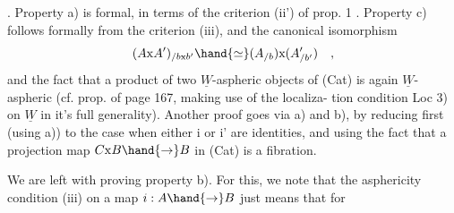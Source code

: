 \hand{\uline{\textcolor{black}{Proof}}}.  Property a) is formal,  in terms of the criterion (ii') of
prop. 1 .  Property c) follows formally from the criterion (iii),  and
the canonical isomorphism
\[ (A\mathrm{x}A')_{/b\mathrm{x}b'} \hand{\simeq} (A_{/b})\mathrm{x}(A'_{/b'}) \quad , \]
and the fact that a product of two $\underline{W}$-aspheric objects of (Cat) is again
$\underline{W}$-aspheric  (cf.  prop. of page 167,  making use of   the localiza-%
tion condition  Loc 3)  on $\underline{W}$  in it's full generality).   Another proof
goes via  a) and b),  by reducing first (using a)) to the case when
either i or i' are identities,  and using the fact that a projection map
$C\mathrm{x}B \hand{\to} B$ in (Cat) is a fibration.

We are left with proving property b).  For this,  we note that the
asphericity condition (iii) on a map $i: A \hand{\to} B$  just means that  for
